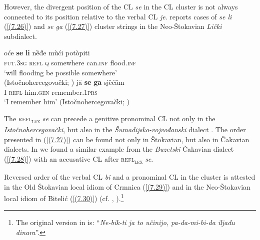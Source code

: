 However, the divergent position of the CL \textit{se} in the CL cluster is not always connected to its position relative to the verbal CL \textit{je}. \citet[91]{Okuka08} reports cases of \textit{se li} (\ref{(7.26)}) and \textit{se ga} (\ref{(7.27)}) cluster strings in the Neo-Štokavian \textit{Lički} subdialect.

\begin{exe}\ex\label{(7.26)}
\gll oće  \textbf{se}  \textbf{li}  nȅđe  mùći  potòpiti  \\
\textsc{fut}.\textsc{3sg}  \textsc{refl}  \textsc{q}  somewhere can.\textsc{inf}  flood.\textsc{inf}  \\
\glt ‘will flooding be possible somewhere’ \\
\hfill  (Istočnohercegovački; \citealt[91]{Okuka08} )
\ex\label{(7.27)}
\gll jȃ  \textbf{se}  \textbf{ga}  sjȅćām  \\
I \textsc{refl}  him.\textsc{gen}  remember.1\textsc{prs}  \\
\glt ‘I remember him’
\hfill  (Istočnohercegovački; \citealt[91]{Okuka08} )
\end{exe}

\noindent The \textsc{refl\textsubscript{lex}} \textit{se} can precede a genitive pronominal CL not only in the \textit{Istočnohercegovački}, but also in the \textit{Šumadijsko-vojvođanski} dialect \citep[cf.][280]{Nikolic66}. The order presented in (\ref{(7.27)}) can be found not only in Štokavian, but also in Čakavian dialects. In \citet[41]{Lisac09} we found a similar example from the \textit{Buzetski} Čakavian dialect (\ref{(7.28)}) with an accusative CL after \textsc{refl\textsubscript{lex}} \textit{se}.


\noindent Reversed order of the verbal CL \textit{bi} and a pronominal CL in the cluster is attested in the Old Štokavian local idiom of Crmnica (\ref{(7.29)}) and in the Neo-Štokavian local idiom of Bitelić (\ref{(7.30)}) (cf. \citealt[180]{Okuka08}, \citealt[309]{Curkovic14}).\footnote{The original version in \citet{Okuka08} is: “\textit{Ne-bik-ti ja to učinijo, pa-da-mi-bi-da iljadu dinara}”.}


